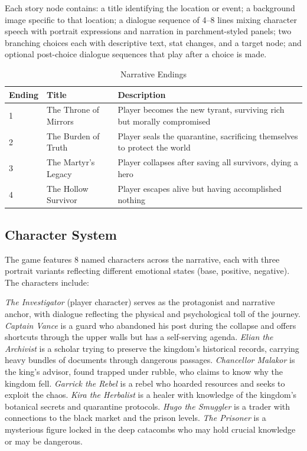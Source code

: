 \documentclass[journal]{IEEEtran}
\begin{document}
Each story node contains: a title identifying the location or event; a background image specific to that location; a dialogue sequence of 4--8 lines mixing character speech with portrait expressions and narration in parchment-styled panels; two branching choices each with descriptive text, stat changes, and a target node; and optional post-choice dialogue sequences that play after a choice is made.

\begin{table}[!ht]
\centering
\caption{Narrative Endings}
\label{tab:endings}
\small
\setlength{\tabcolsep}{3pt}
\begin{tabular}{|l|l|>{\raggedright\arraybackslash}p{1.6in}|}
\hline
\textbf{Ending} & \textbf{Title} & \textbf{Description} \\
\hline
1 & The Throne of Mirrors & Player becomes the new tyrant, surviving rich but morally compromised \\
\hline
2 & The Burden of Truth & Player seals the quarantine, sacrificing themselves to protect the world \\
\hline
3 & The Martyr's Legacy & Player collapses after saving all survivors, dying a hero \\
\hline
4 & The Hollow Survivor & Player escapes alive but having accomplished nothing \\
\hline
\end{tabular}
\vspace{-4pt}
\end{table}

\subsection{Character System}

The game features 8 named characters across the narrative, each with three portrait variants reflecting different emotional states (base, positive, negative). The characters include:

\textit{The Investigator} (player character) serves as the protagonist and narrative anchor, with dialogue reflecting the physical and psychological toll of the journey. \textit{Captain Vance} is a guard who abandoned his post during the collapse and offers shortcuts through the upper walls but has a self-serving agenda. \textit{Elian the Archivist} is a scholar trying to preserve the kingdom's historical records, carrying heavy bundles of documents through dangerous passages. \textit{Chancellor Malakor} is the king's advisor, found trapped under rubble, who claims to know why the kingdom fell. \textit{Garrick the Rebel} is a rebel who hoarded resources and seeks to exploit the chaos. \textit{Kira the Herbalist} is a healer with knowledge of the kingdom's botanical secrets and quarantine protocols. \textit{Hugo the Smuggler} is a trader with connections to the black market and the prison levels. \textit{The Prisoner} is a mysterious figure locked in the deep catacombs who may hold crucial knowledge or may be dangerous.
\end{document}
